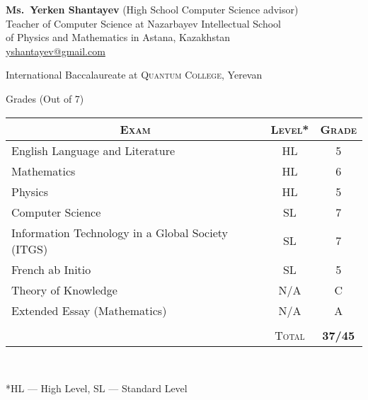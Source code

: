 \documentclass[a4paper,10pt]{article}
\begin{document}
\textbf{Ms.\ Yerken Shantayev} (High School Computer Science advisor)\\
Teacher of Computer Science at Nazarbayev Intellectual School \\of Physics and Mathematics in Astana, Kazakhstan\\
\href{mailto:yshantayev@gmail.com}{yshantayev@gmail.com}\\

\newpage
\par{\centering\Large \hypertarget{ib_grades}{International Baccalaureate at \textsc{Quantum College}, Yerevan}\par}\large{\centering Grades (Out of 7) \par}\normalsize

\begin{center}
\begin{tabular}{lcc}
\multicolumn{1}{c}{\textsc{Exam}}&\textsc{Level*}&\textsc{Grade}\\ \hline
  English Language and Literature	&HL&	5\\
  Mathematics	&HL&	6\\
  Physics	&HL&	5\\
  Computer Science & SL& 7\\
  Information Technology in a Global Society (ITGS) & SL& 7\\
  French ab Initio & SL & 5\\
  Theory of Knowledge & N/A & C\\
  Extended Essay (Mathematics) & N/A & A\\
& &\\\cline{2-3}
 &\textsc{Total}&\textbf{37/45}
\end{tabular}\\
\begin{flushleft}
\footnotesize{*HL --- High Level, SL --- Standard Level}
\end{flushleft}
\end{center}
\end{document}
